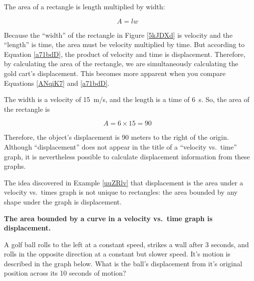 \documentclass[main.tex]{subfiles}
\begin{document}
The area of a rectangle is length multiplied by width:

\begin{equation} \label{ANqiK7}
    A = l w
\end{equation}

Because the ``width'' of the rectangle in Figure \ref{5kJDXd} is velocity and the ``length'' is time, the area must be velocity multiplied by time. But according to Equation \eqref{a71bdD}, the product of velocity and time is displacement. Therefore, by calculating the area of the rectangle, we are simultaneously calculating the gold cart's displacement. This becomes more apparent when you compare Equations \eqref{ANqiK7} and \eqref{a71bdD}.

\vspace{1em}

The width is a velocity of \SI{15}{m/s}, and the length is a time of \SI{6}{s}. So, the area of the rectangle is 

\begin{equation*}
    A = 6 \times 15 = 90
\end{equation*}

Therefore, the object's displacement is 90 meters to the right of the origin. Although ``displacement'' does not appear in the title of a ``velocity vs.~time'' graph, it is nevertheless possible to calculate displacement information from these graphs.

\solutionEnd

The idea discovered in Example \ref{uuZRlv} that displacement is the area under a velocity vs.~times graph is not unique to rectangles: the area bounded by any shape under the graph is displacement.

\begin{mdframed}[backgroundcolor=black!10]
    \centering
    \textbf{The area bounded by a curve in a velocity vs.~time graph is displacement.}
\end{mdframed}

\begin{example}
    A golf ball rolls to the left at a constant speed, strikes a wall after 3 seconds, and rolls in the opposite direction at a constant but slower speed. It's motion is described in the graph below. What is the ball's displacement from it's original position across its 10 seconds of motion?
\end{example}

\begin{center}
\end{center}
\end{document}
